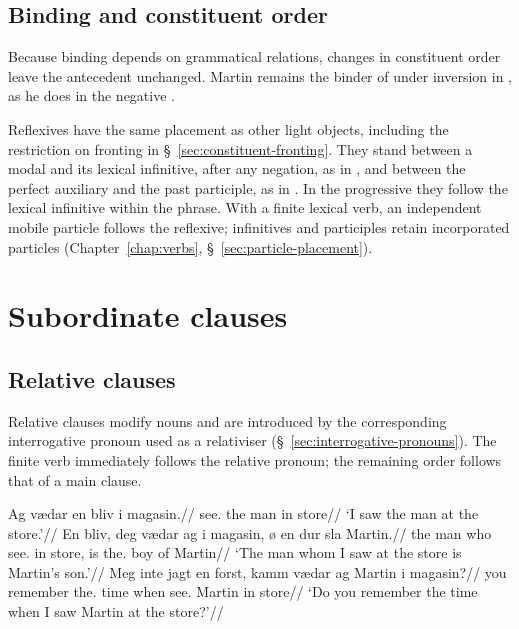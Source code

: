 \subsection{Binding and constituent order}

Because binding depends on grammatical relations, changes in constituent order leave the antecedent unchanged. Martin remains the binder of  under inversion in , as he does in the negative .

Reflexives have the same placement as other light objects, including the restriction on fronting in \S~\ref{sec:constituent-fronting}. They stand between a modal and its lexical infinitive, after any negation, as in , and between the perfect auxiliary and the past participle, as in . In the progressive they follow the lexical infinitive within the  phrase. With a finite lexical verb, an independent mobile particle follows the reflexive; infinitives and participles retain incorporated particles (Chapter~\ref{chap:verbs}, \S~\ref{sec:particle-placement}).

\section{Subordinate clauses}

\subsection{Relative clauses}

Relative clauses modify nouns and are introduced by the corresponding interrogative pronoun used as a relativiser (\S~\ref{sec:interrogative-pronouns}). The finite verb immediately follows the relative pronoun; the remaining order follows that of a main clause.


\pex
\begingl
\gla Ag vædar en bliv i magasin.//
\glb \First{}\Sg{} see.\Pst{} the man in store//
\glft `I saw the man at the store.'//
\endgl
\xe
\pex
\begingl
\gla En bliv, deg vædar ag i magasin, ø en dur sla Martin.//
\glb the man who see.\Pst{} \First{}\Sg{} in store, is the.\M{} boy of Martin//
\glft `The man whom I saw at the store is Martin's son.'//
\endgl
\xe
\pex
\begingl
\gla Meg inte jagt en forst, kamm vædar ag Martin i magasin?//
\glb you \Q{} remember the.\M{} time when see.\Pst{} \First{}\Sg{} Martin in store//
\glft `Do you remember the time when I saw Martin at the store?'//
\endgl
\xe

